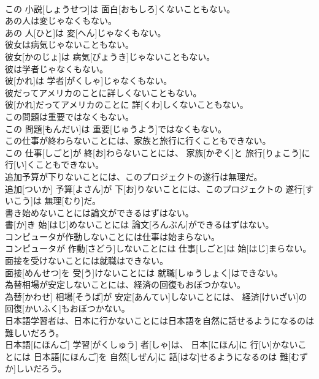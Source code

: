 \documentclass[8pt]{extreport}
\begin{document}
\begin{CJK}{UTF8}{min}
\\	この 小説[しょうせつ]は 面白[おもしろ]くないこともない。
\\	あの人は変じゃなくもない。	
\\	あの 人[ひと]は 変[へん]じゃなくもない。
\\	彼女は病気じゃないこともない。	
\\	彼女[かのじょ]は 病気[びょうき]じゃないこともない。
\\	彼は学者じゃなくもない。	
\\	彼[かれ]は 学者[がくしゃ]じゃなくもない。
\\	彼だってアメリカのことに詳しくないこともない。	
\\	彼[かれ]だってアメリカのことに 詳[くわ]しくないこともない。
\\	この問題は重要ではなくもない。	
\\	この 問題[もんだい]は 重要[じゅうよう]ではなくもない。
\\	この仕事が終わらないことには、家族と旅行に行くこともできない。	
\\	この 仕事[しごと]が 終[お]わらないことには、 家族[かぞく]と 旅行[りょこう]に 行[い]くこともできない。
\\	追加予算が下りないことには、このプロジェクトの遂行は無理だ。	
\\	追加[ついか] 予算[よさん]が 下[お]りないことには、このプロジェクトの 遂行[すいこう]は 無理[むり]だ。
\\	書き始めないことには論文ができるはずはない。	
\\	書[か]き 始[はじ]めないことには 論文[ろんぶん]ができるはずはない。
\\	コンピュータが作動しないことには仕事は始まらない。	
\\	コンピュータが 作動[さどう]しないことには 仕事[しごと]は 始[はじ]まらない。
\\	面接を受けないことには就職はできない。	
\\	面接[めんせつ]を 受[う]けないことには 就職[しゅうしょく]はできない。
\\	為替相場が安定しないことには、経済の回復もおぼつかない。	
\\	為替[かわせ] 相場[そうば]が 安定[あんてい]しないことには、 経済[けいざい]の 回復[かいふく]もおぼつかない。
\\	日本語学習者は、日本に行かないことには日本語を自然に話せるようになるのは難しいだろう。	
\\	日本語[にほんご] 学習[がくしゅう] 者[しゃ]は、 日本[にほん]に 行[い]かないことには 日本語[にほんご]を 自然[しぜん]に 話[はな]せるようになるのは 難[むずか]しいだろう。

\end{CJK}
\end{document}
